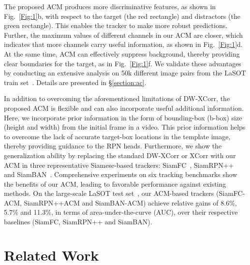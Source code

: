 \documentclass[10pt,twocolumn,letterpaper,final]{cvpr}
\begin{document}
The proposed ACM produces more discriminative features, as shown in Fig.~\ref{Fig:1}b, with respect to the target (the red rectangle) and distractors (the green rectangle). This enables the tracker to make more robust predictions. Further, the maximum values of different channels in our ACM are closer, which indicates that more channels carry useful information, as shown in Fig.~\ref{Fig:1}d. At the same time, ACM can effectively suppress background, thereby providing clear boundaries for the target, as in Fig.~\ref{Fig:1}f. We validate these advantages by conducting an extensive analysis on 50k different image pairs from the LaSOT train set~\cite{fan2019lasot}. Details are presented in \S\ref{section:ac}.
  
  


In addition to overcoming the aforementioned limitations of DW-XCorr, the proposed ACM is flexible and can also incorporate useful additional information. Here, we incorporate prior information in the form of bounding-box (b-box) size (height and width) from the initial frame in a video. This prior information helps to overcome the lack of accurate target-box locations in the template image, thereby providing guidance to the RPN heads.  
Furthermore, we show the generalization ability by replacing the standard DW-XCorr or XCorr with our ACM in three representative Siamese-based trackers: SiamFC~\cite{bertinetto2016fully}, SiamRPN++~\cite{li2019siamrpn} and SiamBAN~\cite{chen2020siamese}.
Comprehensive experiments on six tracking benchmarks show the benefits of our ACM, leading to favorable performance against existing methods. On the large-scale LaSOT test set~\cite{fan2019lasot}, our ACM-based trackers (SiamFC-ACM, SiamRPN++ACM and SiamBAN-ACM) achieve relative gains of 8.6\%, 5.7\%  and 11.3\%, in terms of area-under-the-curve (AUC), over their respective baselines (SiamFC, SiamRPN++ and SiamBAN).





















\section{Related Work}
\end{document}
